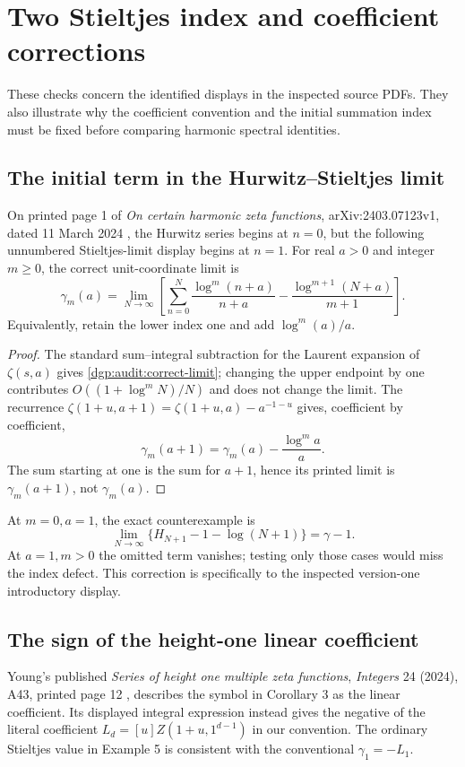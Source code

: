 \section{Two Stieltjes index and coefficient corrections}
\label{dgp:audit:section}
These checks concern the identified displays in the inspected source PDFs.
They also illustrate why the coefficient convention and the initial
summation index must be fixed before comparing harmonic spectral identities.

\subsection{The initial term in the Hurwitz--Stieltjes limit}
\label{dgp:audit:Can}
On printed page 1 of \emph{On certain harmonic zeta functions},
arXiv:2403.07123v1, dated 11 March 2024 \cite{dgp:CanV1}, the Hurwitz
series begins at $n=0$, but the following unnumbered Stieltjes-limit
display begins at $n=1$. For real $a>0$ and integer $m\ge0$, the correct
unit-coordinate limit is
\begin{equation}\label{dgp:audit:correct-limit}
 \gamma_m(a)=\lim_{N\to\infty}\left[
   \sum_{n=0}^N\frac{\log^m(n+a)}{n+a}
        -\frac{\log^{m+1}(N+a)}{m+1}\right].
\end{equation}
Equivalently, retain the lower index one and add $\log^m(a)/a$.
\begin{proof}
The standard sum--integral subtraction for the Laurent expansion of
$\zeta(s,a)$ gives \eqref{dgp:audit:correct-limit}; changing the upper
endpoint by one contributes $O((1+\log^m N)/N)$ and does not change
the limit. The recurrence
$\zeta(1+u,a+1)=\zeta(1+u,a)-a^{-1-u}$ gives, coefficient by coefficient,
\[
 \gamma_m(a+1)=\gamma_m(a)-\frac{\log^m a}{a}.
\]
The sum starting at one is the sum for $a+1$, hence its printed limit is
$\gamma_m(a+1)$, not $\gamma_m(a)$.
\end{proof}
At $m=0,a=1$, the exact counterexample is
\[
 \lim_{N\to\infty}\{H_{N+1}-1-\log(N+1)\}=\gamma-1.
\]
At $a=1,m>0$ the omitted term vanishes; testing only those cases would
miss the index defect. This correction is specifically to the inspected
version-one introductory display.

\subsection{The sign of the height-one linear coefficient}
\label{dgp:audit:Young}
Young's published \emph{Series of height one multiple zeta functions},
\emph{Integers} 24 (2024), A43, printed page 12 \cite{dgp:Young}, describes
the symbol in Corollary 3 as the linear coefficient. Its displayed
integral expression instead gives the negative of the literal coefficient
$L_d=[u]Z(1+u,1^{d-1})$ in our convention. The ordinary Stieltjes value in
Example 5 is consistent with the conventional $\gamma_1=-L_1$.

